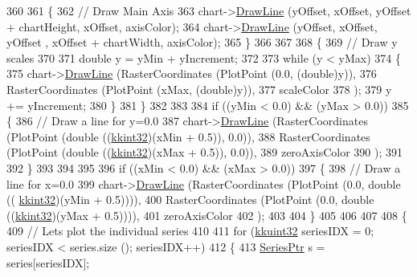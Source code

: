 \begin{DoxyCode}
360 
361   \{
362     \textcolor{comment}{// Draw Main Axis}
363     chart->\hyperlink{class_k_k_b_1_1_raster_a118bf0fa32356ddea42f579c044c65cd}{DrawLine} (yOffset, xOffset, yOffset + chartHeight, xOffset,              axisColor);
364     chart->\hyperlink{class_k_k_b_1_1_raster_a118bf0fa32356ddea42f579c044c65cd}{DrawLine} (yOffset, xOffset, yOffset              , xOffset + chartWidth, axisColor);
365   \}
366 
367 
368   \{
369     \textcolor{comment}{// Draw y scales}
370 
371     \textcolor{keywordtype}{double}  y = yMin + yIncrement;
372 
373     \textcolor{keywordflow}{while}  (y < yMax)
374     \{
375       chart->\hyperlink{class_k_k_b_1_1_raster_a118bf0fa32356ddea42f579c044c65cd}{DrawLine} (RasterCoordinates (PlotPoint (0.0,  (\textcolor{keywordtype}{double})y)),
376                        RasterCoordinates (PlotPoint (xMax, (\textcolor{keywordtype}{double})y)),
377                        scaleColor
378                       );
379       y += yIncrement;
380     \}
381   \}
382 
383 
384   \textcolor{keywordflow}{if}  ((yMin < 0.0)  &&  (yMax > 0.0))
385   \{
386     \textcolor{comment}{// Draw a line for y=0.0}
387     chart->\hyperlink{class_k_k_b_1_1_raster_a118bf0fa32356ddea42f579c044c65cd}{DrawLine} (RasterCoordinates (PlotPoint (\textcolor{keywordtype}{double} ((\hyperlink{namespace_k_k_b_a8fa4952cc84fda1de4bec1fbdd8d5b1b}{kkint32})(xMin + 0.5)),  0.0)),
388                      RasterCoordinates (PlotPoint (\textcolor{keywordtype}{double} ((\hyperlink{namespace_k_k_b_a8fa4952cc84fda1de4bec1fbdd8d5b1b}{kkint32})(xMax + 0.5)),  0.0)),
389                      zeroAxisColor
390                     );
391 
392   \}
393 
394 
395 
396   \textcolor{keywordflow}{if}  ((xMin < 0.0)  &&  (xMax > 0.0))
397   \{
398     \textcolor{comment}{// Draw a line for x=0.0}
399     chart->\hyperlink{class_k_k_b_1_1_raster_a118bf0fa32356ddea42f579c044c65cd}{DrawLine} (RasterCoordinates (PlotPoint (0.0,  \textcolor{keywordtype}{double} ((
      \hyperlink{namespace_k_k_b_a8fa4952cc84fda1de4bec1fbdd8d5b1b}{kkint32})(yMin + 0.5)))),
400                      RasterCoordinates (PlotPoint (0.0,  \textcolor{keywordtype}{double} ((\hyperlink{namespace_k_k_b_a8fa4952cc84fda1de4bec1fbdd8d5b1b}{kkint32})(yMax + 0.5)))),
401                      zeroAxisColor
402                     );
403 
404   \}
405 
406 
407 
408   \{
409     \textcolor{comment}{// Lets plot the individual series}
410 
411     \textcolor{keywordflow}{for}  (\hyperlink{namespace_k_k_b_af8d832f05c54994a1cce25bd5743e19a}{kkuint32} seriesIDX = 0;  seriesIDX < series.size ();  seriesIDX++)
412     \{
413       \hyperlink{class_k_k_b_1_1_chart_1_1_series}{SeriesPtr}  s = series[seriesIDX];

\end{DoxyCode}
